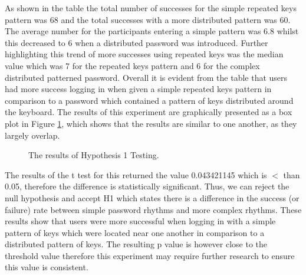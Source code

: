 \documentclass{article}
\begin{document}
As shown in the table the total number of successes for the simple repeated keys pattern was 68 and the total successes with a more distributed pattern was 60. The average number for the participants entering a simple pattern was 6.8 whilst this decreased to 6 when a distributed password was introduced. Further highlighting this trend of more successes using repeated keys was the median value which was 7 for the repeated keys pattern and 6 for the complex distributed patterned password. Overall it is evident from the table that users had more success logging in when given a simple repeated keys pattern in comparison to a password which contained a pattern of keys distributed around the keyboard. The results of this experiment are graphically presented as a box plot in Figure \ref{fig:boxPlotHyp1}, which shows that the results are similar to one another, as they largely overlap.    

\begin{figure} [H]
    \centering
    \caption{The results of Hypothesis 1 Testing.}
    \label{fig:boxPlotHyp1}
\end{figure}

The results of the t test for this returned the value 0.043421145 which is $<$ than 0.05, therefore the difference is statistically significant. Thus, we can reject the null hypothesis and accept H1 which states there is a difference in the	success	(or	failure) rate between simple password rhythms and	more complex rhythms. These results show that users were more successful when logging in with a simple pattern of keys which were located near one another in comparison to a distributed pattern of keys. The resulting p value is however close to the threshold value therefore this experiment may require further research to ensure this value is consistent. 
\end{document}
